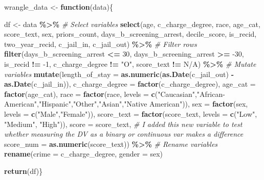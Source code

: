 \documentclass[
]{book}
\newenvironment{Shaded}{\begin{snugshade}}{\end{snugshade}}
\newcommand{\CommentTok}[1]{\textcolor[rgb]{0.56,0.35,0.01}{\textit{#1}}}
\newcommand{\ControlFlowTok}[1]{\textcolor[rgb]{0.13,0.29,0.53}{\textbf{#1}}}
\newcommand{\DataTypeTok}[1]{\textcolor[rgb]{0.13,0.29,0.53}{#1}}
\newcommand{\DecValTok}[1]{\textcolor[rgb]{0.00,0.00,0.81}{#1}}
\newcommand{\KeywordTok}[1]{\textcolor[rgb]{0.13,0.29,0.53}{\textbf{#1}}}
\newcommand{\NormalTok}[1]{#1}
\newcommand{\OperatorTok}[1]{\textcolor[rgb]{0.81,0.36,0.00}{\textbf{#1}}}
\newcommand{\StringTok}[1]{\textcolor[rgb]{0.31,0.60,0.02}{#1}}
\begin{document}
\begin{Shaded}
\begin{Highlighting}[]
\NormalTok{wrangle\_data \textless{}{-}}\StringTok{ }\ControlFlowTok{function}\NormalTok{(data)\{}

\NormalTok{df \textless{}{-}}\StringTok{ }\NormalTok{data }\OperatorTok{\%\textgreater{}\%}\StringTok{ }
\StringTok{    }
\StringTok{    }\CommentTok{\# Select variables }
\StringTok{    }\KeywordTok{select}\NormalTok{(age, c\_charge\_degree, race, age\_cat, score\_text, sex, priors\_count, days\_b\_screening\_arrest, decile\_score, is\_recid, two\_year\_recid, }
\NormalTok{         c\_jail\_in, c\_jail\_out) }\OperatorTok{\%\textgreater{}\%}\StringTok{ }
\StringTok{    }\CommentTok{\# Filter rows }
\StringTok{    }\KeywordTok{filter}\NormalTok{(days\_b\_screening\_arrest }\OperatorTok{\textless{}=}\StringTok{ }\DecValTok{30}\NormalTok{,}
\NormalTok{           days\_b\_screening\_arrest }\OperatorTok{\textgreater{}=}\StringTok{ }\DecValTok{{-}30}\NormalTok{, }
\NormalTok{           is\_recid }\OperatorTok{!=}\StringTok{ }\DecValTok{{-}1}\NormalTok{,}
\NormalTok{           c\_charge\_degree }\OperatorTok{!=}\StringTok{ "O"}\NormalTok{,}
\NormalTok{           score\_text }\OperatorTok{!=}\StringTok{ \textquotesingle{}N/A\textquotesingle{}}\NormalTok{) }\OperatorTok{\%\textgreater{}\%}\StringTok{ }
\StringTok{    }\CommentTok{\# Mutate variables }
\StringTok{    }\KeywordTok{mutate}\NormalTok{(}\DataTypeTok{length\_of\_stay =} \KeywordTok{as.numeric}\NormalTok{(}\KeywordTok{as.Date}\NormalTok{(c\_jail\_out) }\OperatorTok{{-}}\StringTok{ }\KeywordTok{as.Date}\NormalTok{(c\_jail\_in)),}
           \DataTypeTok{c\_charge\_degree =} \KeywordTok{factor}\NormalTok{(c\_charge\_degree),}
           \DataTypeTok{age\_cat =} \KeywordTok{factor}\NormalTok{(age\_cat),}
           \DataTypeTok{race =} \KeywordTok{factor}\NormalTok{(race, }\DataTypeTok{levels =} \KeywordTok{c}\NormalTok{(}\StringTok{"Caucasian"}\NormalTok{,}\StringTok{"African{-}American"}\NormalTok{,}\StringTok{"Hispanic"}\NormalTok{,}\StringTok{"Other"}\NormalTok{,}\StringTok{"Asian"}\NormalTok{,}\StringTok{"Native American"}\NormalTok{)),}
           \DataTypeTok{sex =} \KeywordTok{factor}\NormalTok{(sex, }\DataTypeTok{levels =} \KeywordTok{c}\NormalTok{(}\StringTok{"Male"}\NormalTok{,}\StringTok{"Female"}\NormalTok{)),}
           \DataTypeTok{score\_text =} \KeywordTok{factor}\NormalTok{(score\_text, }\DataTypeTok{levels =} \KeywordTok{c}\NormalTok{(}\StringTok{"Low"}\NormalTok{, }\StringTok{"Medium"}\NormalTok{, }\StringTok{"High"}\NormalTok{)),}
           \DataTypeTok{score =}\NormalTok{ score\_text,}
\CommentTok{\# I added this new variable to test whether measuring the DV as a binary or continuous var makes a difference }
           \DataTypeTok{score\_num =} \KeywordTok{as.numeric}\NormalTok{(score\_text)) }\OperatorTok{\%\textgreater{}\%}\StringTok{ }
\StringTok{    }\CommentTok{\# Rename variables }
\StringTok{    }\KeywordTok{rename}\NormalTok{(}\DataTypeTok{crime =}\NormalTok{ c\_charge\_degree,}
           \DataTypeTok{gender =}\NormalTok{ sex)}
        
\KeywordTok{return}\NormalTok{(df)\}}
\end{Highlighting}
\end{Shaded}
\end{document}

